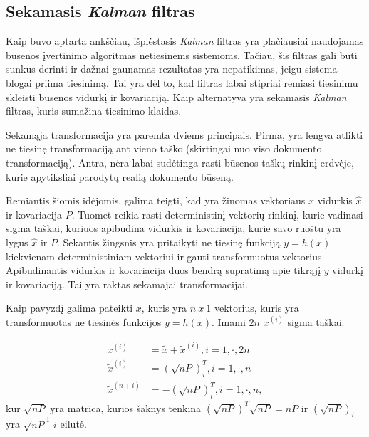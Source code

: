 \subsection{Sekamasis \textit{Kalman} filtras}


Kaip buvo aptarta ankščiau, išplėstasis \textit{Kalman} filtras yra plačiausiai naudojamas būsenos įvertinimo algoritmas netiesinėms sistemoms.
Tačiau, šis filtras gali būti sunkus derinti ir dažnai gaunamas rezultatas yra nepatikimas, jeigu sistema blogai priima tiesinimą.
Tai yra dėl to, kad filtras labai stipriai remiasi tiesinimu skleisti būsenos vidurkį ir kovariaciją.
Kaip alternatyva yra sekamasis \textit{Kalman} filtras, kuris sumažina tiesinimo klaidas.

Sekamąja transformacija yra paremta dviems principais.
Pirma, yra lengva atlikti ne tiesinę transformaciją ant vieno taško (skirtingai nuo viso dokumento transformaciją).
Antra, nėra labai sudėtinga rasti būsenos taškų rinkinį erdvėje, kurie apytiksliai parodytų realią dokumento būseną.

Remiantis šiomis idėjomis, galima teigti, kad yra žinomas vektoriaus $x$ vidurkis $\hat{x}$ ir kovariacija $P$.
Tuomet reikia rasti deterministinį vektorių rinkinį, kurie vadinasi sigma taškai, kuriuos apibūdina vidurkis ir kovariacija, kurie savo ruoštu yra lygus $\hat{x}$ ir $P$.
Sekantis žingsnis yra pritaikyti ne tiesinę funkciją $y = h(x)$ kiekvienam deterministiniam vektoriui ir gauti transformuotus vektorius.
Apibūdinantis vidurkis ir kovariacija duos bendrą supratimą apie tikrąjį $y$ vidurkį ir kovariaciją.
Tai yra raktas sekamajai transformacijai.

Kaip pavyzdį galima pateikti $x$, kuris yra $n~x~1$ vektorius, kuris yra transformuotas ne tiesinės funkcijos $y = h(x)$.
Imami $2n$ $x^{(i)}$ sigma taškai:

\begin{equation}
    \begin{aligned}
    x^{(i)} &= \tilde{x} + \tilde{x}^{(i)}, i = 1, \cdot, 2n \\
    \tilde{x}^{(i)} &= (\sqrt{nP})^T_i, i = 1,\cdot,n\\
    \tilde{x}^{(n+i)} &= -(\sqrt{nP})^T_i, i = 1, \cdot, n,
    \end{aligned}
\end{equation}
kur $\sqrt{nP}$ yra matrica, kurios šaknys tenkina $(\sqrt{nP})^T\sqrt{nP} = nP$ ir $(\sqrt{nP})_i$ yra $\sqrt{nP}^1$ $i$ eilutė.

